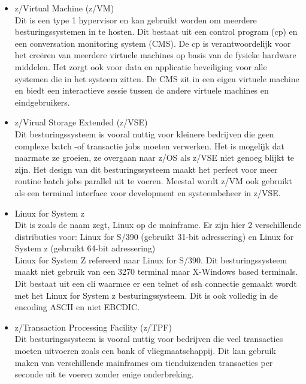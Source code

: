 \begin{itemize}
    \item z/Virtual Machine (z/VM)\\
    Dit is een type 1 hypervisor en kan gebruikt worden om meerdere besturingssystemen in te hosten. Dit bestaat uit een control program (cp) en een conversation monitoring system (CMS). De cp is verantwoordelijk voor het creëren van meerdere virtuele machines op basis van de fysieke hardware middelen. Het zorgt ook voor data en applicatie beveiliging voor alle systemen die in het systeem zitten. De CMS zit in een eigen virtuele machine en biedt een interactieve sessie tussen de andere virtuele machines en eindgebruikers. \autocite{IBMb} \\
    
    \item z/Virual Storage Extended (z/VSE) \\
    Dit besturingssysteem is vooral nuttig voor kleinere bedrijven die geen complexe batch -of transactie jobs moeten verwerken. Het is mogelijk dat naarmate ze groeien, ze overgaan naar z/OS als z/VSE niet genoeg blijkt te zijn. Het design van dit besturingssysteem maakt het perfect voor meer routine batch jobs parallel uit te voeren. Meestal wordt z/VM ook gebruikt als een terminal interface voor development en systeembeheer in z/VSE. \autocite{IBMb} \\
    
    \item Linux for System z \\
    Dit is zoals de naam zegt, Linux op de mainframe. Er zijn hier 2 verschillende distributies voor: Linux for S/390 (gebruikt 31-bit adressering) en Linux for System z (gebruikt 64-bit adressering) \\
    Linux for System Z refereerd naar Linux for S/390. Dit besturingssysteem maakt niet gebruik van een 3270 terminal maar X-Windows based terminals. Dit bestaat uit een cli waarmee er een telnet of ssh connectie gemaakt wordt met het Linux for System z besturingssysteem. Dit is ook volledig in de encoding ASCII en niet EBCDIC. \autocite{IBMb} \\
    
    \item z/Transaction Processing Facility (z/TPF) \\
    Dit besturingssysteem is vooral nuttig voor bedrijven die veel transacties moeten uitvoeren zoals een bank of vliegmaatschappij. Dit kan gebruik maken van verschillende mainframes om tienduizenden transacties per seconde uit te voeren zonder enige onderbreking. \autocite{IBMb}
\end{itemize}


